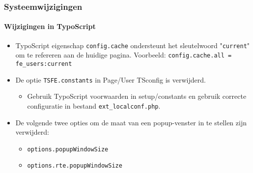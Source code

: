\begin{frame}[fragile]
	\frametitle{Systeemwijzigingen}
	\framesubtitle{Wijzigingen in TypoScript}

	\begin{itemize}
		\item TypoScript eigenschap \texttt{config.cache} ondersteunt het sleutelwoord
			"\texttt{current}" om te refereren aan de huidige pagina. Voorbeeld:\newline
			\smaller\texttt{config.cache.all = fe\_users:current}\normalsize

		\item De optie \texttt{TSFE.constants} in Page/User TSconfig is verwijderd.

			\begin{itemize}\smaller
				\item[\ding{228}] Gebruik TypoScript voorwaarden  in setup/constants en gebruik correcte configuratie in bestand \texttt{ext\_localconf.php}.
			\end{itemize}

		\item De volgende twee opties om de maat van een popup-venster in te stellen zijn verwijderd:

			\begin{itemize}
				\item \texttt{options.popupWindowSize}
				\item \texttt{options.rte.popupWindowSize}
			\end{itemize}

	\end{itemize}

\end{frame}


